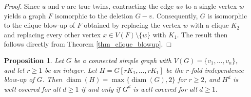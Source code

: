 \documentclass[10pt,a4paper]{amsart}
\numberwithin{equation}{section}
\newtheorem{prop}[thm]{\bf Proposition}
\theoremstyle{definition}
\begin{document}
\begin{proof}
Since $u$ and $v$ are true twins, contracting the edge $uv$ to a single vertex $w$ yields a graph $F$ isomorphic to the deletion $G - v$. Consequently, $G$ is isomorphic to the clique blow-up of $F$ obtained by replacing the vertex $w$ with a clique $K_2$ and replacing every other vertex $x \in V(F) \setminus \{w\}$ with $K_1$. The result then follows directly from Theorem \ref{thm_clique_blowup}.
\end{proof}

\begin{prop}\label{prop_ind_blow}
Let $G$ be a connected simple graph with $V(G) = \{v_1, \ldots, v_n\}$, and let $r \ge 1$ be an integer. Let $H = G[r K_1, \ldots, r K_1]$ be the $r$-fold independence blow-up of $G$. 
Then $\operatorname{diam}(H) = \max\{\operatorname{diam}(G), 2\}$ for $r \ge 2$, and $H^d$ is well-covered for all $d \ge 1$ if and only if $G^d$ is well-covered for all $d \ge 1$.
\end{prop}
\end{document}
